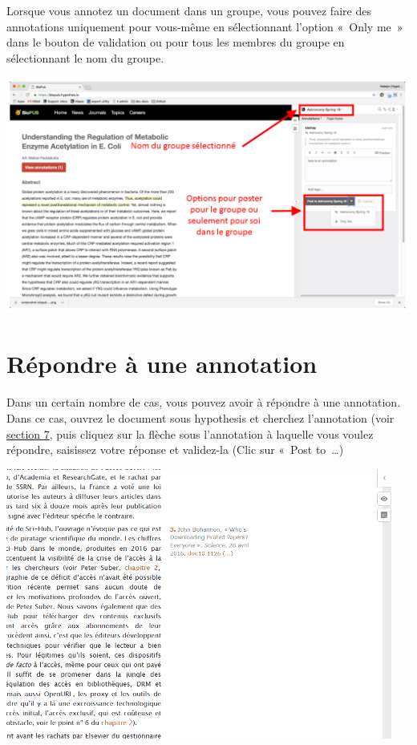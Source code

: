 \documentclass[
]{book}
\begin{document}
Lorsque vous annotez un document dans un groupe, vous pouvez faire des annotations uniquement pour vous-même en sélectionnant l'option «~Only me~» dans le bouton de validation ou pour tous les membres du groupe en sélectionnant le nom du groupe.

\includegraphics{img/postGroup.png}

\hypertarget{s65}{%
\section{Répondre à une annotation}\label{s65}}

Dans un certain nombre de cas, vous pouvez avoir à répondre à une annotation. Dans ce cas, ouvrez le document sous hypothesis et cherchez l'annotation (voir \protect\hyperlink{s7}{section 7}, puis cliquez sur la flèche sous l'annotation à laquelle vous voulez répondre, saisissez votre réponse et validez-la (Clic sur «~Post to~\ldots)

\includegraphics{img/30f5eff1df71626cf0748cd0af596424.gif}
\end{document}
